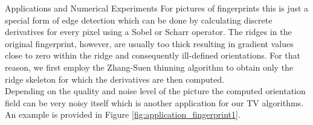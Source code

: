 \begin{chapter}{Applications and Numerical Experiments}
For pictures of fingerprints this is just a special form of edge detection which can be done by calculating discrete derivatives for every pixel using a Sobel or Scharr operator. The ridges in the original fingerprint, however, are usually too thick resulting in gradient values close to zero within the ridge and
consequently ill-defined orientations. For that reason, we first employ the Zhang-Suen thinning algorithm \cite{zhangsuen} to obtain only the ridge skeleton
for which the derivatives are then computed.\\

Depending on the quality and noise level of the picture the computed orientation field can be very noisy itself which is another application
for our TV algorithms. An example is provided in Figure \ref{fig:application_fingerprint1}. 


\end{chapter}

